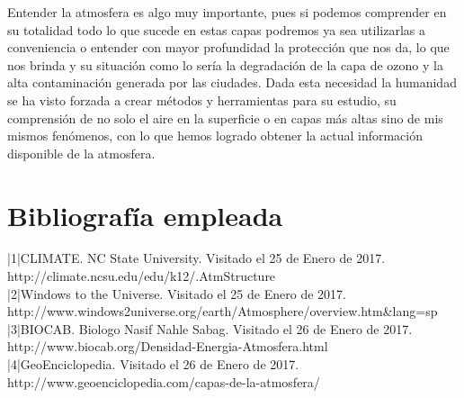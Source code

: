 \documentclass[a4paper,12pt]{report}
\begin{document}
Entender la atmosfera es algo muy importante, pues si podemos comprender en su totalidad todo lo que sucede en estas capas podremos ya sea utilizarlas a conveniencia o entender con mayor profundidad la protección que nos da, lo que nos brinda y su situación como lo sería la degradación de la capa de ozono y la alta contaminación generada por las ciudades. Dada esta necesidad la humanidad se ha visto forzada a crear métodos y herramientas para su estudio, su comprensión de no solo el aire en la superficie o en capas más altas sino de mis mismos fenómenos, con lo que hemos logrado obtener la actual información disponible de la atmosfera.


\chapter{Bibliografía empleada}

|1|CLIMATE. NC State University. Visitado el 25 de Enero de 2017. http://climate.ncsu.edu/edu/k12/.AtmStructure
\\[1cm]
|2|Windows to the Universe. Visitado el 25 de Enero de 2017. http://www.windows2universe.org/earth/Atmosphere/overview.htm\&lang=sp
\\[1cm]
|3|BIOCAB. Biologo Nasif Nahle Sabag. Visitado el 26 de Enero de 2017. http://www.biocab.org/Densidad-Energia-Atmosfera.html
\\[1cm]
|4|GeoEnciclopedia. Visitado el 26 de Enero de 2017. http://www.geoenciclopedia.com/capas-de-la-atmosfera/
\end{document}
